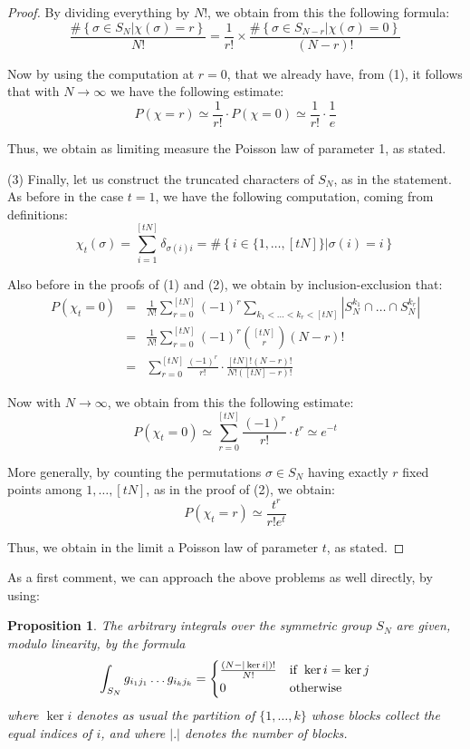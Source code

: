 \documentclass[12pt]{amsbook}
\newtheorem{proposition}[theorem]{Proposition}
\begin{document}
\begin{proof}
By dividing everything by $N!$, we obtain from this the following formula:
$$\frac{\#\left\{\sigma\in S_N\Big|\chi(\sigma)=r\right\}}{N!}=\frac{1}{r!}\times\frac{\#\left\{\sigma\in S_{N-r}\Big|\chi(\sigma)=0\right\}}{(N-r)!}$$

Now by using the computation at $r=0$, that we already have, from (1), it follows that with $N\to\infty$ we have the following estimate:
$$P(\chi=r)
\simeq\frac{1}{r!}\cdot P(\chi=0)
\simeq\frac{1}{r!}\cdot\frac{1}{e}$$

Thus, we obtain as limiting measure the Poisson law of parameter 1, as stated.

\medskip

(3) Finally, let us construct the truncated characters of $S_N$, as in the statement. As before in the case $t=1$, we have the following computation, coming from definitions:
$$\chi_t(\sigma)
=\sum_{i=1}^{[tN]}\delta_{\sigma(i)i}
=\#\left\{i\in\{1,\ldots,[tN]\}\Big|\sigma(i)=i\right\}$$

Also before in the proofs of (1) and (2), we obtain by inclusion-exclusion that:
\begin{eqnarray*}
P(\chi_t=0)
&=&\frac{1}{N!}\sum_{r=0}^{[tN]}(-1)^r\sum_{k_1<\ldots<k_r<[tN]}|S_N^{k_1}\cap\ldots\cap S_N^{k_r}|\\
&=&\frac{1}{N!}\sum_{r=0}^{[tN]}(-1)^r\binom{[tN]}{r}(N-r)!\\
&=&\sum_{r=0}^{[tN]}\frac{(-1)^r}{r!}\cdot\frac{[tN]!(N-r)!}{N!([tN]-r)!}
\end{eqnarray*}

Now with $N\to\infty$, we obtain from this the following estimate:
$$P(\chi_t=0)
\simeq\sum_{r=0}^{[tN]}\frac{(-1)^r}{r!}\cdot t^r
\simeq e^{-t}$$

More generally, by counting the permutations $\sigma\in S_N$ having exactly $r$ fixed points among $1,\ldots,[tN]$, as in the proof of (2), we obtain:
$$P(\chi_t=r)\simeq\frac{t^r}{r!e^t}$$

Thus, we obtain in the limit a Poisson law of parameter $t$, as stated.
\end{proof}

As a first comment, we can approach the above problems as well directly, by using:


\begin{proposition}
The arbitrary integrals over the symmetric group $S_N$ are given, modulo linearity, by the formula
$$\int_{S_N}g_{i_1j_1}\ldots g_{i_kj_k}=\begin{cases}
\frac{(N-|\ker i|)!}{N!}&{\rm if}\ \ker i=\ker j\\
0&{\rm otherwise}
\end{cases}$$
where $\ker i$ denotes as usual the partition of $\{1,\ldots,k\}$ whose blocks collect the equal indices of $i$, and where $|.|$ denotes the number of blocks.
\end{proposition}
\end{document}
